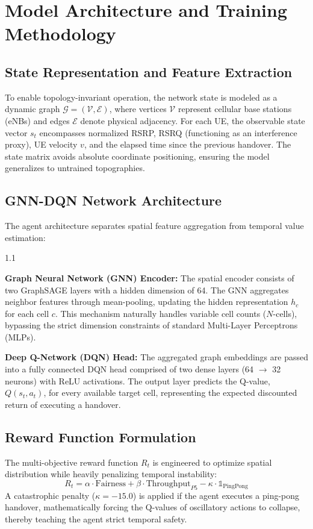 \section{Model Architecture and Training Methodology}

\subsection{State Representation and Feature Extraction}
To enable topology-invariant operation, the network state is modeled as a dynamic graph $\mathcal{G} = (\mathcal{V}, \mathcal{E})$, where vertices $\mathcal{V}$ represent cellular base stations (eNBs) and edges $\mathcal{E}$ denote physical adjacency. For each UE, the observable state vector $s_t$ encompasses normalized RSRP, RSRQ (functioning as an interference proxy), UE velocity $v$, and the elapsed time since the previous handover. The state matrix avoids absolute coordinate positioning, ensuring the model generalizes to untrained topographies.

\subsection{GNN-DQN Network Architecture}
The agent architecture separates spatial feature aggregation from temporal value estimation:
\begin{itemize}
    \begin{spacing}{1.1}
    \item \textbf{Graph Neural Network (GNN) Encoder:} The spatial encoder consists of two GraphSAGE layers with a hidden dimension of 64. The GNN aggregates neighbor features through mean-pooling, updating the hidden representation $h_c$ for each cell $c$. This mechanism naturally handles variable cell counts ($N$-cells), bypassing the strict dimension constraints of standard Multi-Layer Perceptrons (MLPs).
    \item \textbf{Deep Q-Network (DQN) Head:} The aggregated graph embeddings are passed into a fully connected DQN head comprised of two dense layers (64 $\rightarrow$ 32 neurons) with ReLU activations. The output layer predicts the Q-value, $Q(s_t, a_t)$, for every available target cell, representing the expected discounted return of executing a handover.
    \end{spacing}
\end{itemize}

\subsection{Reward Function Formulation}
The multi-objective reward function $R_t$ is engineered to optimize spatial distribution while heavily penalizing temporal instability:
\begin{equation}
R_t = \alpha \cdot \text{Fairness} + \beta \cdot \text{Throughput}_{P5} - \kappa \cdot \mathbb{1}_{\text{PingPong}}
\end{equation}
A catastrophic penalty ($\kappa = -15.0$) is applied if the agent executes a ping-pong handover, mathematically forcing the Q-values of oscillatory actions to collapse, thereby teaching the agent strict temporal safety.

